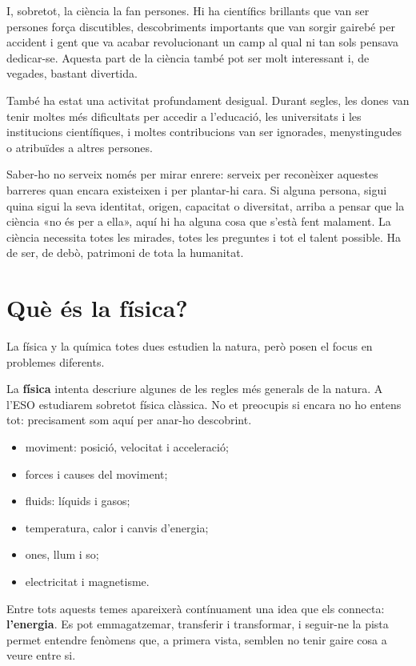 I, sobretot, la ciència la fan persones. Hi ha científics brillants que van ser persones força discutibles, descobriments importants que van sorgir gairebé per accident i gent que va acabar revolucionant un camp al qual ni tan sols pensava dedicar-se. Aquesta part de la ciència també pot ser molt interessant i, de vegades, bastant divertida.

També ha estat una activitat profundament desigual. Durant segles, les dones van tenir moltes més dificultats per accedir a l’educació, les universitats i les institucions científiques, i moltes contribucions van ser ignorades, menystingudes o atribuïdes a altres persones.

Saber-ho no serveix només per mirar enrere: serveix per reconèixer aquestes barreres quan encara existeixen i per plantar-hi cara. Si alguna persona, sigui quina sigui la seva identitat, origen, capacitat o diversitat, arriba a pensar que la ciència «no és per a ella», aquí hi ha alguna cosa que s’està fent malament. La ciència necessita totes les mirades, totes les preguntes i tot el talent possible. Ha de ser, de debò, patrimoni de tota la humanitat.

\section{Què és la física?}

La física y la química totes dues estudien la natura, però posen el focus en problemes diferents.

La \textbf{física} intenta descriure algunes de les regles més generals de la natura. A l’ESO estudiarem sobretot física clàssica. No et preocupis si encara no ho entens tot: precisament som aquí per anar-ho descobrint.

\begin{itemize}
    \item moviment: posició, velocitat i acceleració;
    \item forces i causes del moviment;
    \item fluids: líquids i gasos;
    \item temperatura, calor i canvis d’energia;
    \item ones, llum i so;
    \item electricitat i magnetisme.
\end{itemize}
Entre tots aquests temes apareixerà contínuament una idea que els connecta: \textbf{l’energia}. Es pot emmagatzemar, transferir i transformar, i seguir-ne la pista permet entendre fenòmens que, a primera vista, semblen no tenir gaire cosa a veure entre si.

